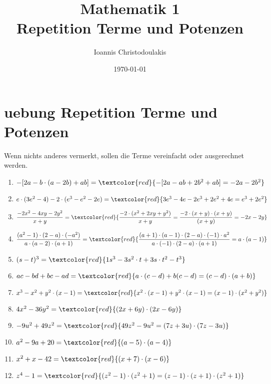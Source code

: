 \documentclass[11pt, a4paper, twoside, fleqn]{article}
\title{\Huge Mathematik 1\\
\large Repetition Terme und Potenzen}
\author{Ioannis Christodoulakis}
\date{\today}
\begin{document}
\maketitle
\newpage
\tableofcontents
\newpage
\section{uebung  Repetition Terme und Potenzen}
Wenn nichts anderes vermerkt, sollen die Terme vereinfacht oder ausgerechnet werden.
\begin{enumerate} [itemsep=3ex]
\item $ -[2a - b \cdot (a - 2b) +ab] = \textcolor{red}{-[2a - ab + 2b^{2} +ab] = -2a - 2b^{2}} $ 
\item $ e \cdot (3e^{2} - 4) -2 \cdot (e^{3} - e^{2} - 2e) = \textcolor{red}{3e^{3} - 4e - 2e^{3} + 2e^{2} + 4e = e^{3} + 2e^{2}} $
\item $ \dfrac{-2x^{2} - 4xy - 2y^{2}}{x+y} = \textcolor{red}{\dfrac{-2 \cdot (x^{2} + 2xy + y^{2})}{x+y} = \dfrac{-2 \cdot(x + y) \cdot (x + y)}{(x + y)} = -2x - 2y} $
\item $ \dfrac{(a^{2} - 1) \cdot (2 - a) \cdot (-a^{2})}{a \cdot (a - 2) \cdot (a + 1)} = \textcolor{red}{\dfrac{(a + 1) \cdot (a - 1) \cdot (2 - a) \cdot (-1) \cdot a^{2}}{a \cdot (-1) \cdot (2 - a) \cdot (a + 1)} = a \cdot (a - 1)}  $
\item $ (s - t)^{3} = \textcolor{red}{1s^{3} - 3s^{2} \cdot t + 3s \cdot t^{2} - t^{3}} $
\item $ ac - bd +bc - ad = \textcolor{red}{a \cdot (c - d) +b (c-d) = (c - d) \cdot (a + b)} $
\item $ x^{3} - x^{2} + y^{2} \cdot (x - 1) = \textcolor{red}{x^{2} \cdot (x - 1) + y^{2} \cdot (x - 1) = (x - 1) \cdot (x^{2} + y^{2})} $
\item $ 4x^{2} - 36y^{2} = \textcolor{red}{(2x + 6y) \cdot (2x - 6y)} $
\item $ -9u^{2} + 49z^{2} = \textcolor{red}{49z^{2} - 9u^{2} = (7z + 3u) \cdot (7z - 3u) } $
\item $ a^{2} - 9a + 20 = \textcolor{red}{(a- 5) \cdot (a - 4)} $
\item $ x^{2} + x - 42 = \textcolor{red}{(x + 7) \cdot (x - 6)} $
\item $ z^{4} - 1 = \textcolor{red}{(z^{2}-1)\cdot(z^{2}+1) = (z-1) \cdot (z+1) \cdot(z^{2}+1) } $

\end{enumerate}
\end{document}

